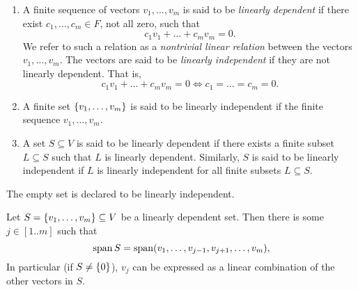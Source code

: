 
\begin{defn} \label{defn:vector:linear_independence} \leavevmode
    \begin{enumerate}[label=(\alph*)]
        \item A finite sequence of vectors $v_{1}, \dots, v_{m}$ is said to be \emph{linearly dependent} if there exist $c_{1}, \dots, c_{m} \in F$, not all zero, such that \[
            c_{1} v_{1} + \dots + c_{m} v_{m} = 0.
        \] We refer to such a relation as a \emph{nontrivial linear relation} between the vectors $v_{1}, \dots, v_{m}$.
        The vectors are said to be \emph{linearly independent} if they are not linearly dependent.
        That is, \[
            c_{1} v_{1} + \dots + c_{m} v_{m} = 0 \iff c_{1} = \dots = c_{m} = 0.
        \]
        \item A finite set $\set{v_{1}, \dots, v_{m}}$ is said to be linearly independent if the finite sequence $v_{1}, \dots, v_{m}$.
        \item A set $S \subseteq V$ is said to be linearly dependent if there exists a finite subset $L \subseteq S$ such that $L$ is linearly dependent.
        Similarly, $S$ is said to be linearly independent if $L$ is linearly independent for all finite subsets $L \subseteq S$.
    \end{enumerate}

    The empty set is declared to be linearly independent.
\end{defn}

\begin{prop}[] \label{thm:vector:redundancy}
    Let $S = \set{v_{1}, \dots, v_{m}} \subseteq V$ be a linearly dependent set.
    Then there is some $j \in [1 .. m]$ such that \[
        \operatorname{span} S = \operatorname{span}(v_{1}, \dots, v_{j-1}, v_{j+1}, \dots, v_{m}),
    \]
    In particular (if $S \neq \set{0}$), $v_{j}$ can be expressed as a linear combination of the other vectors in $S$.
\end{prop}

